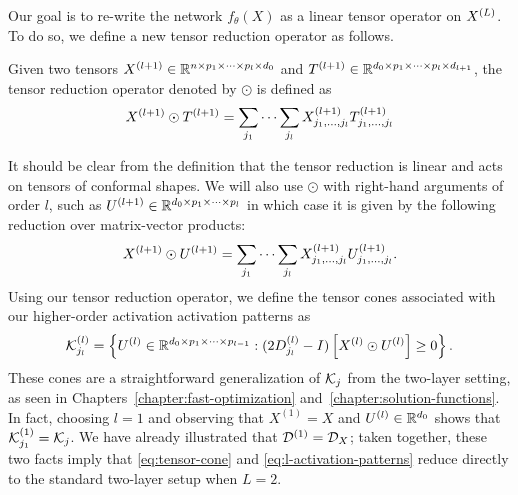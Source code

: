Our goal is to re-write the network \( f_\theta(X) \) as a linear tensor
operator on \( X^{(L)} \).
To do so, we define a new tensor reduction operator as follows.
\begin{definition}
    Given two tensors
    \( X^{(l+1)} \in \mathbb{R}^{n \times p_1 \times \cdots \times p_l \times d_0} \)
    and
    \( T^{(l+1)} \in \mathbb{R}^{d_0 \times p_1 \times \cdots \times p_l \times d_{l+1}} \),
    the tensor reduction operator denoted by \( \odot \) is defined as
    \begin{equation}\label{eq:tensor-reduction}
        X^{(l+1)} \odot T^{(l+1)} = \sum_{j_{1}} \cdots \sum_{j_{l}}
        X^{(l+1)}_{j_1, \ldots, j_{l}} T^{(l+1)}_{j_1, \ldots, j_{l}}
    \end{equation}
\end{definition}
It should be clear from the definition that the tensor reduction is
linear and acts on tensors of conformal shapes.
We will also use \( \odot \) with right-hand arguments of order
\( l \), such as \( U^{(l+1)} \in \mathbb{R}^{d_0 \times p_1 \times \cdots \times p_{l}} \)
in which case it is given by the following reduction over
matrix-vector products:
\[
    X^{(l+1)} \odot U^{(l+1)} = \sum_{j_{1}} \cdots \sum_{j_{l}}
    X^{(l+1)}_{j_1, \ldots, j_{l}} U^{(l+1)}_{j_1, \ldots, j_{l}}.
\]
Using our tensor reduction operator, we define the tensor cones
associated with our higher-order activation activation patterns as
\begin{equation}\label{eq:tensor-cone}
    \mathcal{K}^{(l)}_{j_{l}} =
    \left\{
    U^{(l)} \in \mathbb{R}^{d_0 \times p_{1} \times \cdots \times p_{l-1}}
    :
    (2D^{(l)}_{j_{l}} - I)
    \left[X^{(l)} \odot U^{(l)}\right] \geq 0
    \right\}.
\end{equation}
These cones are a straightforward generalization of \( \mathcal{K}_j \) from
the two-layer setting, as seen in Chapters~\ref{chapter:fast-optimization}
and~\ref{chapter:solution-functions}.
In fact, choosing \( l = 1 \) and observing that \( X^{(1)} = X \) and
\( U^{(l)} \in \mathbb{R}^{d_0} \) shows that \( \mathcal{K}^{(1)}_{j_1} = \mathcal{K}_j \).
We have already illustrated that \( \mathcal{D}^{(1)} = \mathcal{D}_X \); taken together,
these two facts imply that \cref{eq:tensor-cone} and
\cref{eq:l-activation-patterns} reduce directly to the standard two-layer setup
when \( L = 2 \).

